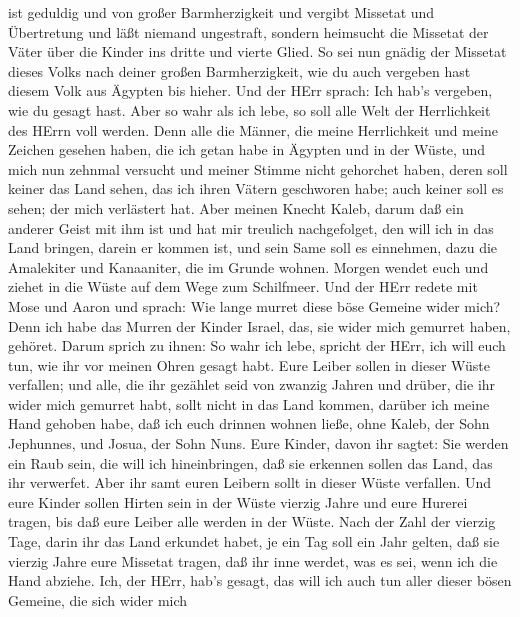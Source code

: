 ist geduldig und von großer Barmherzigkeit und vergibt Missetat und
Übertretung und läßt niemand ungestraft, sondern heimsucht die Missetat
der Väter über die Kinder ins dritte und vierte Glied.  So
sei nun gnädig der Missetat dieses Volks nach deiner großen
Barmherzigkeit, wie du auch vergeben hast diesem Volk aus Ägypten bis
hieher.  Und der HErr sprach: Ich hab's vergeben, wie du
gesagt hast.  Aber so wahr als ich lebe, so soll alle Welt
der Herrlichkeit des HErrn voll werden.  Denn alle die
Männer, die meine Herrlichkeit und meine Zeichen gesehen haben, die ich
getan habe in Ägypten und in der Wüste, und mich nun zehnmal versucht
und meiner Stimme nicht gehorchet haben,  deren soll keiner
das Land sehen, das ich ihren Vätern geschworen habe; auch keiner soll
es sehen; der mich verlästert hat.  Aber meinen Knecht
Kaleb, darum daß ein anderer Geist mit ihm ist und hat mir treulich
nachgefolget, den will ich in das Land bringen, darein er kommen ist,
und sein Same soll es einnehmen,  dazu die Amalekiter und
Kanaaniter, die im Grunde wohnen. Morgen wendet euch und ziehet in die
Wüste auf dem Wege zum Schilfmeer.  Und der HErr redete mit
Mose und Aaron und sprach:  Wie lange murret diese böse
Gemeine wider mich? Denn ich habe das Murren der Kinder Israel, das, sie
wider mich gemurret haben, gehöret.  Darum sprich zu ihnen:
So wahr ich lebe, spricht der HErr, ich will euch tun, wie ihr vor
meinen Ohren gesagt habt.  Eure Leiber sollen in dieser
Wüste verfallen; und alle, die ihr gezählet seid von zwanzig Jahren und
drüber, die ihr wider mich gemurret habt,  sollt nicht in
das Land kommen, darüber ich meine Hand gehoben habe, daß ich euch
drinnen wohnen ließe, ohne Kaleb, der Sohn Jephunnes, und Josua, der
Sohn Nuns.  Eure Kinder, davon ihr sagtet: Sie werden ein
Raub sein, die will ich hineinbringen, daß sie erkennen sollen das Land,
das ihr verwerfet.  Aber ihr samt euren Leibern sollt in
dieser Wüste verfallen.  Und eure Kinder sollen Hirten sein
in der Wüste vierzig Jahre und eure Hurerei tragen, bis daß eure Leiber
alle werden in der Wüste.  Nach der Zahl der vierzig Tage,
darin ihr das Land erkundet habet, je ein Tag soll ein Jahr gelten, daß
sie vierzig Jahre eure Missetat tragen, daß ihr inne werdet, was es sei,
wenn ich die Hand abziehe.  Ich, der HErr, hab's gesagt,
das will ich auch tun aller dieser bösen Gemeine, die sich wider mich
